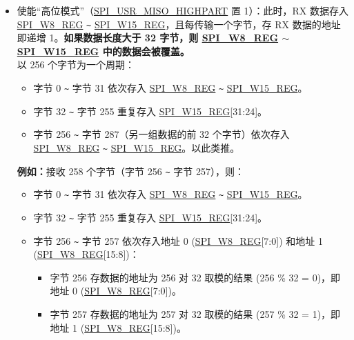 \documentclass[main\_\_CN.tex]{subfiles}
\begin{document}
\begin{itemize}
\begin{itemize}
        \item 使能“高位模式”（\hyperref[fielddesc:SPIUSRMISOHIGHPART]{SPI\_USR\_MISO\_HIGHPART} 置 1）：此时，RX 数据存入 \hyperref[regdesc:SPIW0REG]{SPI\_W8\_REG} \verb+~+ \hyperref[regdesc:SPIW0REG]{SPI\_W15\_REG}，且每传输一个字节，存 RX 数据的地址即递增 1。\textbf{如果数据长度大于 32 字节，则 \hyperref[regdesc:SPIW0REG]{SPI\_W8\_REG} $\sim$ \hyperref[regdesc:SPIW0REG]{SPI\_W15\_REG} 中的数据会被覆盖。}\\
        以 256 个字节为一个周期：
        \begin{itemize}
            \item 字节 0 \verb+~+ 字节 31 依次存入 \hyperref[regdesc:SPIW0REG]{SPI\_W8\_REG} \verb+~+ \hyperref[regdesc:SPIW0REG]{SPI\_W15\_REG}。
            \item 字节 32 \verb+~+ 字节 255 重复存入 \hyperref[regdesc:SPIW0REG]{SPI\_W15\_REG}[31:24]。
            \item 字节 256 \verb+~+ 字节 287（另一组数据的前 32 个字节）依次存入 \hyperref[regdesc:SPIW0REG]{SPI\_W8\_REG} \verb+~+ \hyperref[regdesc:SPIW0REG]{SPI\_W15\_REG}。以此类推。
        \end{itemize}
        \textbf{例如：}接收 258 个字节（字节 256 \verb+~+ 字节 257），则：
        \begin{itemize}
            \item 字节 0 \verb+~+ 字节 31 依次存入 \hyperref[regdesc:SPIW0REG]{SPI\_W8\_REG} \verb+~+ \hyperref[regdesc:SPIW0REG]{SPI\_W15\_REG}。
            \item 字节 32 \verb+~+ 字节 255 重复存入 \hyperref[regdesc:SPIW0REG]{SPI\_W15\_REG}[31:24]。
            \item 字节 256 \verb+~+ 字节 257 依次存入地址 0 (\hyperref[regdesc:SPIW0REG]{SPI\_W8\_REG}[7:0]) 和地址 1 (\hyperref[regdesc:SPIW0REG]{SPI\_W8\_REG}[15:8])：
            \begin{itemize}
                \item 字节 256 存数据的地址为 256 对 32 取模的结果 (256 \% 32 = 0)，即地址 0 (\hyperref[regdesc:SPIW0REG]{SPI\_W8\_REG}[7:0])。
                \item 字节 257 存数据的地址为 257 对 32 取模的结果 (257 \% 32 = 1)，即地址 1 (\hyperref[regdesc:SPIW0REG]{SPI\_W8\_REG}[15:8])。
            \end{itemize}
        \end{itemize}

    \end{itemize}
\end{itemize}
\end{document}
